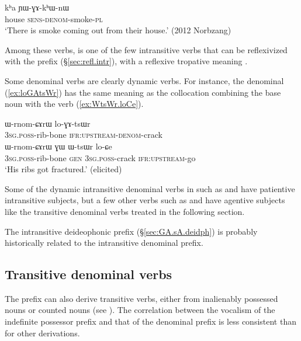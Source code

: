 \begin{exe}
\ex \label{ex:kha.YWGAkhWnW}
 \gll  kʰa ɲɯ-ɣɤ-kʰɯ-nɯ \\
 house \textsc{sens}-\textsc{denom}-smoke-\textsc{pl} \\
\glt `There is smoke coming out from their house.' (2012 Norbzang) 
\end{exe} 

Among these verbs,  is one of the few intransitive verbs that can be reflexivized with the  prefix (§\ref{sec:refl.intr}), with a reflexive tropative meaning . 

Some  denominal verbs are clearly dynamic verbs. For instance, the denominal  (\ref{ex:loGAtsWr})  has the same meaning as the collocation combining the base noun  with the verb   (\ref{ex:WtsWr.loCe}).

\begin{exe}
\ex 
\begin{xlist}
\ex \label{ex:loGAtsWr}
 \gll ɯ-rnom-ɕɤrɯ lo-ɣɤ-tsɯr \\
\textsc{3sg}.\textsc{poss}-rib-bone  \textsc{ifr}:\textsc{upstream}-\textsc{denom}-crack \\
\ex \label{ex:WtsWr.loCe}
 \gll ɯ-rnom-ɕɤrɯ ɣɯ ɯ-tsɯr lo-ɕe \\
\textsc{3sg}.\textsc{poss}-rib-bone \textsc{gen} \textsc{3sg}.\textsc{poss}-crack  \textsc{ifr}:\textsc{upstream}-go \\
 \glt `His ribs got fractured.' (elicited)
 \end{xlist}
\end{exe} 

Some of the dynamic intransitive denominal verbs in  such as  and  have patientive intransitive subjects, but a few other verbs such as  and  have agentive subjects like the transitive denominal  verbs treated in the following section.

The intransitive deideophonic  prefix (§\ref{sec:GA.sA.deidph}) is probably historically related to the  intransitive denominal prefix.

\subsection{Transitive  denominal verbs}   \label{sec:denom.tr.GA}
The  prefix can also derive transitive verbs,  either from inalienably possessed nouns or counted nouns (see ). The correlation between the  vocalism of the indefinite possessor prefix  and that of the denominal prefix   is less consistent than for other derivations. 
 
